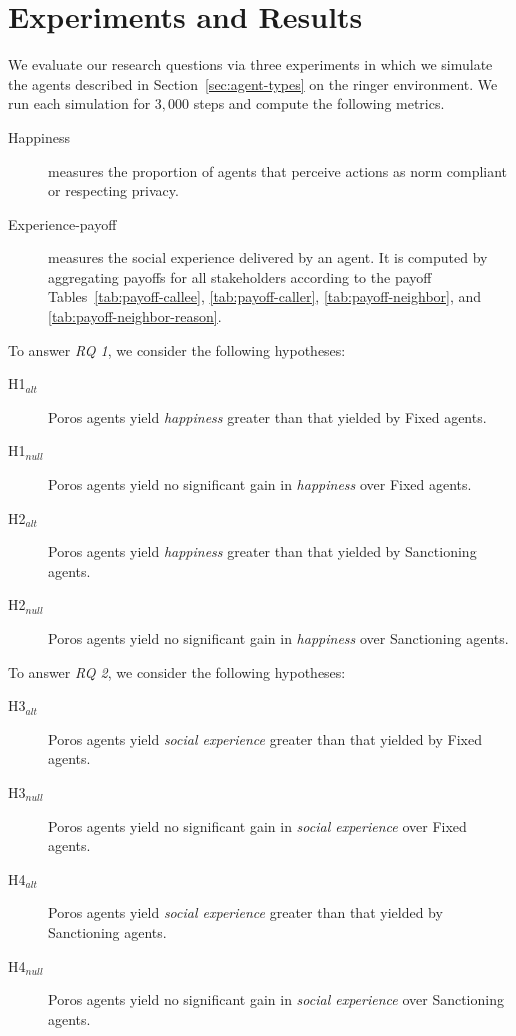 \documentclass[11pt,          %
               phd,           %
               onehalfspacing %
               ]{ncsuthesis}
\newcommand{\fsl}{\textsl}
\newcommand{\frameworkB}{Poros\xspace}
\begin{document}
\section{Experiments and Results}
\label{sec:precious-experiments}

We evaluate our research questions via three experiments in which we
simulate the agents described in
Section~\ref{sec:agent-types} on the ringer environment. We run each
simulation for $3,000$ steps and compute the following metrics.

\begin{description}
\item[Happiness] measures the proportion of agents that perceive actions
as norm compliant or respecting privacy.

\item[Experience-payoff] measures the social experience delivered by an agent. 
It is computed by aggregating payoffs for all stakeholders according to
the payoff Tables~\ref{tab:payoff-callee}, \ref{tab:payoff-caller},
\ref{tab:payoff-neighbor}, and \ref{tab:payoff-neighbor-reason}.

\end{description}

To answer \fsl{RQ 1}, we consider the following hypotheses:
\begin{description}
\item[H1$_{alt}$] \frameworkB agents yield \fsl{happiness} greater than that yielded by Fixed agents.
\item[H1$_{null}$] \frameworkB agents yield no significant gain in \fsl{happiness} over Fixed agents.
\item[H2$_{alt}$] \frameworkB agents yield \fsl{happiness} greater than that yielded by Sanctioning agents.
\item[H2$_{null}$]  \frameworkB agents yield no significant gain in \fsl{happiness} over Sanctioning agents.
\end{description}

To answer \fsl{RQ 2}, we consider the following hypotheses:
\begin{description}
\item[H3$_{alt}$] \frameworkB agents yield \fsl{social experience} greater than that yielded by Fixed agents.
\item[H3$_{null}$] \frameworkB agents yield no significant gain in \fsl{social experience} over Fixed agents.
\item[H4$_{alt}$] \frameworkB agents yield \fsl{social experience} greater than that yielded by Sanctioning agents.
\item[H4$_{null}$]  \frameworkB agents yield no significant gain in \fsl{social experience} over Sanctioning agents.
\end{description}
\end{document}
